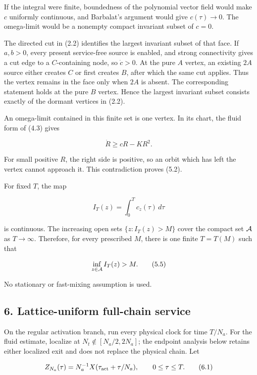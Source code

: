 If the integral were finite, boundedness of the polynomial vector field
would make \(c\) uniformly continuous, and Barbalat's argument would
give \(c(\tau)\to0\). The omega-limit would be a nonempty compact
invariant subset of \(c=0\).

The directed cut in (2.2) identifies the largest invariant subset of
that face. If \(a,b>0\), every present service-free source is enabled,
and strong connectivity gives a cut edge to a \(C\)-containing node, so
\(\dot c>0\). At the pure \(A\) vertex, an existing \(2A\) source either
creates \(C\) or first creates \(B\), after which the same cut applies.
Thus the vertex remains in the face only when \(2A\) is absent. The
corresponding statement holds at the pure \(B\) vertex. Hence the
largest invariant subset consists exactly of the dormant vertices in
(2.2).

An omega-limit contained in this finite set is one vertex. In its chart,
the fluid form of (4.3) gives

\[
                             \dot R\ge cR-KR^2.          \tag{5.3}
\]

For small positive \(R\), the right side is positive, so an orbit which
has left the vertex cannot approach it. This contradiction proves (5.2).

For fixed \(T\), the map

\[
                         I_T(z)=\int_0^T c_z(\tau)\,d\tau               \tag{5.4}
\]

is continuous. The increasing open sets \(\{z:I_T(z)>M\}\) cover the
compact set \({\cal A}\) as \(T\to\infty\). Therefore, for every
prescribed \(M\), there is one finite \(T=T(M)\) such that

\[
                         \inf_{z\in{\cal A}}I_T(z)>M.   \tag{5.5}
\]

No stationary or fast-mixing assumption is used.

\subsection{6. Lattice-uniform full-chain
service}

On the regular activation branch, run every physical clock for time
\(T/N_a\). For the fluid estimate, localize at
\(N_t\notin[N_a/2,2N_a]\); the endpoint analysis below retains either
localized exit and does not replace the physical chain. Let

\[
 Z_{N_a}(\tau)
 =N_a^{-1}X(\tau_{\rm act}+\tau/N_a),\qquad 0\le\tau\le T.              \tag{6.1}
\]

